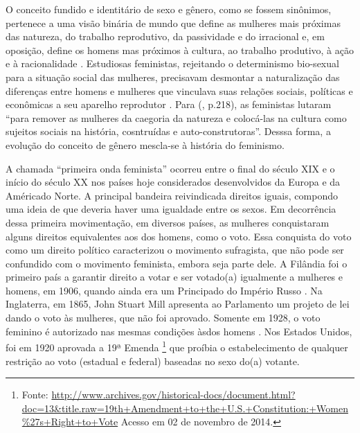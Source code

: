 O conceito fundido e identitário de sexo e gênero, como se fossem sinônimos, pertenece a uma visão binária de mundo que define as mulheres mais próximas das natureza, do trabalho reprodutivo, da passividade e do irracional e, em oposição, define os homens mas próximos à cultura, ao trabalho produtivo, à ação e à racionalidade \cite{HARAWAY2004}.
Estudiosas feministas, rejeitando o determinismo bio-sexual para a situação social das mulheres, precisavam desmontar a naturalização das diferenças entre homens e mulheres que vinculava suas relações sociais, políticas e econômicas a seu aparelho reprodutor \cite{PISCITELLI2009}. 
Para  (\citeyear{HARAWAY2004}, p.218), as feministas lutaram ``para remover as mulheres da caegoria da natureza e colocá-las na cultura como sujeitos sociais na história, cosntruídas e auto-construtoras''. Desssa forma, a evolução do conceito de gênero mescla-se à história do feminismo.

A chamada ``primeira onda feminista'' ocorreu entre o final do século XIX e o início do século XX nos países hoje considerados desenvolvidos da Europa e da Américado Norte. A principal bandeira reivindicada direitos iguais, compondo uma ideia de que deveria haver uma igualdade entre os sexos. Em decorrência dessa primeira movimentação, em diversos países, as mulheres conquistaram alguns direitos equivalentes aos dos homens, como o voto. Essa conquista do voto como um direito político caracterizou o movimento sufragista, que não pode ser confundido com o movimento feminista, embora seja parte dele.
A Filândia foi o primeiro país a garantir direito a votar e ser votado(a) igualmente a mulheres e homens, em 1906, quando ainda era um Principado do Império Russo \cite{RAY1918}.
Na Inglaterra, em 1865, John Stuart Mill apresenta ao Parlamento um projeto de lei dando o voto às mulheres, que não foi aprovado. Somente em 1928, o voto feminino é autorizado nas mesmas condições àsdos homens \cite{NELSON2004}.
Nos Estados Unidos, foi em 1920 aprovada a 19ª Emenda
\footnote{Fonte: \url{http://www.archives.gov/historical-docs/document.html?doc=13&title.raw=19th+Amendment+to+the+U.S.+Constitution:+Women\%27s+Right+to+Vote} Acesso em 02 de novembro de 2014.} que proíbia o estabelecimento de qualquer restrição ao voto (estadual e federal) baseadas no sexo do(a) votante. 
 
